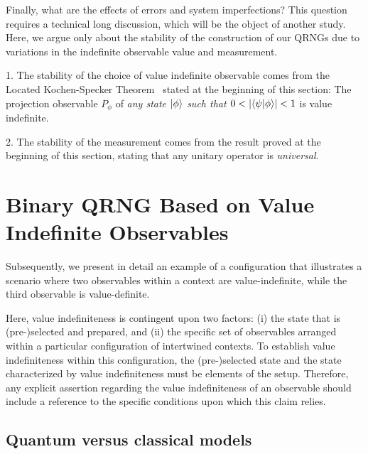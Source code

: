 \documentclass[%
 reprint,
 superscriptaddress,
 showpacs,
 showkeys,
 nofootinbib,
  amsmath,amssymb,
 pra,
  longbibliography,
  floatfix,
 ]{revtex4-2}
\theoremstyle{definition}
\begin{document}
Finally, what are the effects of errors and system imperfections?
This question requires a technical long discussion, which will be the object of another study. Here, we argue only about the stability of the construction of our QRNGs due to variations in the indefinite observable value and measurement.


1. The stability of the choice of value indefinite observable comes from the Located Kochen-Specker Theorem~\cite{2012-incomput-proofsCJ,2015-AnalyticKS} stated at the beginning of this section:
The projection observable $P_\phi$ of {\it any state $\ket{\phi}$ such that {\rm $0<\abs{\bra{\psi}\ket{\phi}}<1$}}
is value
indefinite.


2. The stability of the measurement comes from the result proved at the beginning of this section, stating that any unitary operator is {\it universal}.


\section{Binary QRNG Based on Value Indefinite Observables}
\label{2023-viext-qrngdefs}

Subsequently, we present in detail an example of a configuration that illustrates a scenario where two observables within a context are value-indefinite, while the third observable is value-definite.

Here, value indefiniteness is contingent upon two factors:
(i) the state that is (pre-)selected and prepared, and
(ii) the specific set of observables arranged within a particular configuration of intertwined contexts.
To establish value indefiniteness within this configuration, the (pre-)selected state and the state characterized by value indefiniteness must be elements of the setup.
Therefore, any explicit assertion regarding the value indefiniteness of an observable should include a reference to the specific conditions upon which this claim relies.

\subsection{Quantum versus classical models}
\end{document}
